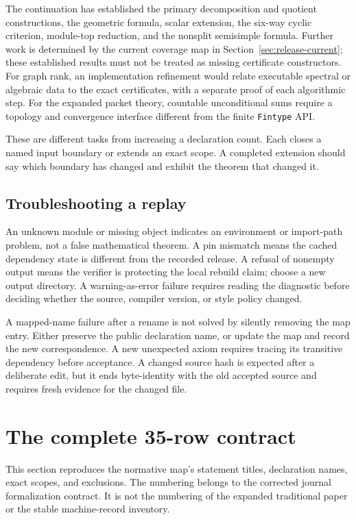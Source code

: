 \documentclass[11pt,a4paper]{article}
\newcommand{\code}[1]{\nolinkurl{#1}}
\begin{document}
The continuation has established the primary decomposition and quotient constructions, the geometric formula, scalar extension, the six-way cyclic criterion, module-top reduction, and the nonsplit semisimple formula. Further work is determined by the current coverage map in Section~\ref{sec:release-current}; these established results must not be treated as missing certificate constructors. For graph rank, an implementation refinement would relate executable spectral or algebraic data to the exact certificates, with a separate proof of each algorithmic step. For the expanded packet theory, countable unconditional sums require a topology and convergence interface different from the finite \code{Fintype} API.

These are different tasks from increasing a declaration count. Each closes a named input boundary or extends an exact scope. A completed extension should say which boundary has changed and exhibit the theorem that changed it.

\subsection{Troubleshooting a replay}

An unknown module or missing object indicates an environment or import-path problem, not a false mathematical theorem. A pin mismatch means the cached dependency state is different from the recorded release. A refusal of nonempty output means the verifier is protecting the local rebuild claim; choose a new output directory. A warning-as-error failure requires reading the diagnostic before deciding whether the source, compiler version, or style policy changed.

A mapped-name failure after a rename is not solved by silently removing the map entry. Either preserve the public declaration name, or update the map and record the new correspondence. A new unexpected axiom requires tracing its transitive dependency before acceptance. A changed source hash is expected after a deliberate edit, but it ends byte-identity with the old accepted source and requires fresh evidence for the changed file.

\clearpage
\section{The complete 35-row contract}\label{sec:map}

This section reproduces the normative map's statement titles, declaration names, exact scopes, and exclusions. The numbering belongs to the corrected journal formalization contract. It is not the numbering of the expanded traditional paper or the stable machine-record inventory.
\end{document}
